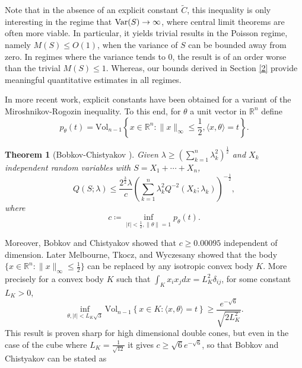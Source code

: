\documentclass[11pt]{article}
\newtheorem{thm}{Theorem}[section]
\newcommand{\R}{\mathbb{R}}
\DeclareMathOperator{\Var}{Var}
\newcommand{\1}{[1]}
\newcommand{\vol}{\mathrm{Vol}}
\def\Var{{\rm Var}}
\begin{document}
Note that in the absence of an explicit constant $\widetilde{C}$, this inequality is only interesting in the regime that $\Var(S) \to \infty$, where central limit theorems are often more viable.  In particular, it yields trivial results in the Poisson regime, namely $M(S) \leq O(1)$, when the variance of $S$ can be bounded away from zero. In regimes where the variance tends to $0$, the result is of an order worse than the trivial $M(S) \leq 1$. Whereas, our bounds derived in Section \ref{2} provide meaningful quantitative estimates in all regimes.



In more recent work, explicit constants have been obtained for a variant of the Miroshnikov-Rogozin inequality. To this end, for $\theta$ a unit vector in $\mathbb{R}^n$ define
\[
    p_\theta(t) = \vol_{n-1} \left\{ x \in \R^n : \|x\|_\infty \leq \frac 1 2, \langle x, \theta \rangle = t \right\}.
\]



\begin{thm}[Bobkov-Chistyakov \cite{BC}]
    Given $\lambda \geq \left(\sum_{k=1}^n \lambda_k^2 \right)^{\frac 1 2}$ and $X_k$ independent random variables with $S = X_1 + \cdots + X_n$,
    \[
        Q(S; \lambda) \leq  \frac{ 2^{\frac 3 2} \lambda}{c}   \left( \sum_{k=1}^n \lambda_k^2 Q^{-2}(X_k; \lambda_k) \right)^{- \frac 1 2},
    \]
    where  $$c \coloneqq  \inf_{|t| <\frac 1 2, \|\theta\| = 1 } p_\theta(t).$$ 
\end{thm}
Moreover, Bobkov and Chistyakov showed that $c \geq 0.00095$ independent of dimension.
Later Melbourne, Tkocz, and Wyczesany \cite{MTW} showed that the body $\{ x \in \R^n : \|x\|_\infty \leq \frac 1 2 \}$ can be replaced by any isotropic convex body $K$.  More precisely for a convex body $K$ such that  $\int_K x_i x_j dx = L_K^2 \delta_{ij}$,  for some constant $L_K > 0$, 
\[
    \inf_{\theta, |t| < L_K \sqrt{3}}  \vol_{n-1} \left \{ x \in K : \langle x , \theta \rangle = t \right \} \geq \frac{e^{- \sqrt{6}}}{\sqrt{2 L_K^2}}.
\]
This result is proven sharp for high dimensional double cones, but even in the case of the cube where $L_K = \frac{1}{\sqrt{12}}$ it gives $c \geq \sqrt{6} e^{- \sqrt{6}}$, so that Bobkov and Chistyakov can be stated as 
\end{document}
